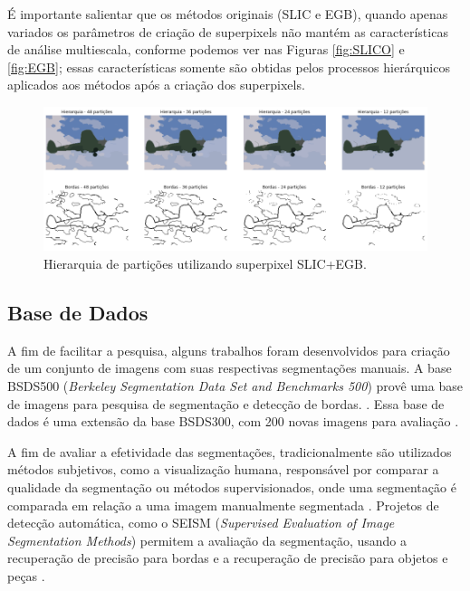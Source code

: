 \begin{document}
É importante salientar que os métodos originais (SLIC e EGB), quando apenas variados os parâmetros de criação de superpixels não mantém as características de análise multiescala, conforme podemos ver nas Figuras \ref{fig:SLICO} e \ref{fig:EGB}; essas características somente são obtidas pelos processos hierárquicos aplicados aos métodos após a criação dos superpixels.

\begin{figure}[ht]
\centering
\includegraphics[width=1.\textwidth]{slic_hierarquia_particoes.png}
\caption{Hierarquia de partições utilizando superpixel SLIC+EGB.}
\label{fig:hierarq_partit}
\end{figure}


\subsection{Base de Dados} \label{ssec:segmentacao}

A fim de facilitar a pesquisa, alguns trabalhos foram desenvolvidos para criação de um conjunto de imagens com suas respectivas segmentações manuais. A base BSDS500 (\textit{Berkeley Segmentation Data Set and Benchmarks 500}) provê uma base de imagens para pesquisa de segmentação e detecção de bordas. \cite{BSDS500}. Essa base de dados é uma extensão da base BSDS300, com 200 novas imagens para avaliação \cite{BSDS500}.

A fim de avaliar a efetividade das segmentações, tradicionalmente são utilizados métodos subjetivos, como a visualização humana, responsável por comparar a qualidade da segmentação ou métodos supervisionados, onde uma segmentação é comparada em relação a uma imagem manualmente segmentada \cite{ZHANG2008}. Projetos de detecção automática, como o SEISM (\textit{Supervised Evaluation of Image Segmentation Methods}) permitem a avaliação da segmentação, usando a recuperação de precisão para bordas e a recuperação de precisão para objetos e peças \cite{SEISM}.
\end{document}
